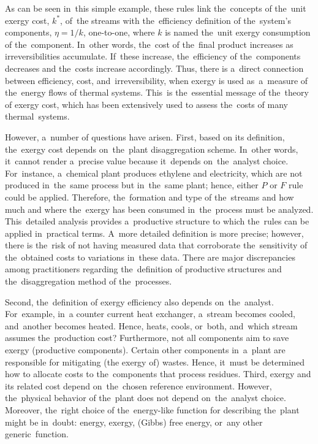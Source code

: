 \documentclass[energies,article,accept,moreauthors,pdftex]{Definitions/mdpi}
\begin{document}
As can be seen in~this simple example, these rules link the~concepts of the~unit exergy cost, $k^*$, of~the streams with the~efficiency definition of the~system's components, $\eta= 1/k$, one-to-one, where $k$ is named the~unit exergy consumption of the~component. In~other words, the~cost of the~final product increases as irreversibilities accumulate. If~these increase, the~efficiency of the~components decreases and the~costs increase accordingly. Thus, there is a~direct connection between efficiency, cost, and~irreversibility, when exergy is used as~a~measure of the~energy flows of thermal systems. This~is the~essential message of the~theory of exergy cost, which has been extensively used to assess the~costs of many thermal~systems.

However, a~number of questions have arisen. First, based on its definition, the~exergy cost depends on~the~plant disaggregation scheme. In~other words, it~cannot render a~precise value because it~depends on~the~analyst choice. For~instance, a~chemical plant produces ethylene and electricity, which are not produced in~the~same process but in~the~same plant; hence, either $P$ or $F$ rule could be applied. Therefore, the~formation and type of the~streams and how much and where the~exergy has been consumed in~the~process must be analyzed. This~detailed analysis provides a~productive structure to which the~rules can be applied in~practical terms. A~more detailed definition is more precise; however, there is the~risk of not having measured data that corroborate the~sensitivity of the~obtained costs to variations in~these data. There are major discrepancies among practitioners regarding the~definition of productive structures and the~disaggregation method of the~processes.

Second, the~definition of exergy efficiency also depends on~the~analyst. For~example, in~a counter current heat exchanger, a~stream becomes cooled, and~another becomes heated. Hence, heats, cools, or~both, and~which stream assumes the~production cost? Furthermore, not all components aim to save exergy (productive components). Certain other components in~a~plant are responsible for mitigating (the exergy of) wastes. Hence, it~must be determined how to allocate costs to the~components that process residues.
Third, exergy and its related cost depend on~the~chosen reference environment. However, the~physical behavior of the~plant does not depend on~the~analyst choice. Moreover, the~right choice of the~energy-like function for describing the~plant might be in~doubt: energy, exergy, (Gibbs) free energy, or~any other generic~function.
\end{document}
